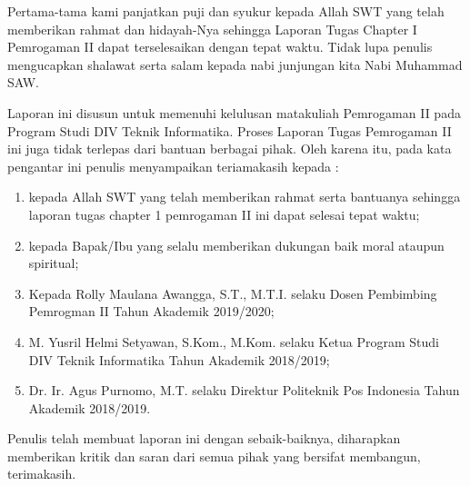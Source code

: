 \begin{acknowlegements}
Pertama-tama kami panjatkan puji dan syukur kepada Allah SWT yang telah memberikan rahmat dan hidayah-Nya sehingga Laporan Tugas Chapter I Pemrogaman II dapat terselesaikan dengan tepat waktu. Tidak lupa penulis mengucapkan shalawat serta salam kepada nabi junjungan kita Nabi Muhammad SAW.

Laporan ini disusun untuk memenuhi kelulusan matakuliah Pemrogaman II pada Program Studi DIV Teknik Informatika. Proses Laporan Tugas Pemrogaman II ini juga tidak terlepas dari bantuan berbagai pihak. Oleh karena itu, pada kata pengantar ini penulis menyampaikan teriamakasih kepada :
\begin{enumerate}

\item kepada Allah SWT yang telah memberikan rahmat serta bantuanya sehingga laporan tugas chapter 1 pemrogaman II ini dapat selesai tepat waktu;
\item  kepada Bapak/Ibu yang selalu memberikan dukungan baik moral ataupun spiritual;
\item	Kepada Rolly Maulana Awangga, S.T., M.T.I. selaku Dosen Pembimbing Pemrogman II Tahun Akademik 2019/2020;
\item	M. Yusril Helmi Setyawan, S.Kom., M.Kom. selaku Ketua Program Studi DIV Teknik Informatika Tahun Akademik 2018/2019;
\item	Dr. Ir. Agus Purnomo, M.T. selaku Direktur Politeknik Pos Indonesia Tahun Akademik 2018/2019.

\end{enumerate}

Penulis telah membuat laporan ini dengan sebaik-baiknya, diharapkan memberikan kritik dan saran dari semua pihak yang bersifat membangun, terimakasih.
\end{acknowlegements}